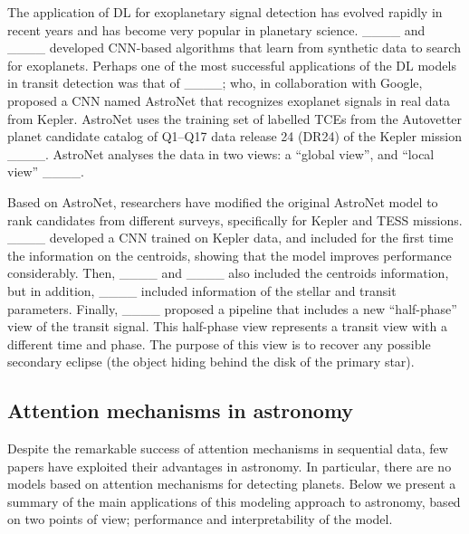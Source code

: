 The application of DL for exoplanetary signal detection has evolved rapidly in recent years and has become very popular in planetary science.  ____ and ____ developed CNN-based algorithms that learn from synthetic data to search for exoplanets. Perhaps one of the most successful applications of the DL models in transit detection was that of ____; who, in collaboration with Google, proposed a CNN named AstroNet that recognizes exoplanet signals in real data from Kepler. AstroNet uses the training set of labelled TCEs from the Autovetter planet candidate catalog of Q1–Q17 data release 24 (DR24) of the Kepler mission ____. AstroNet analyses the data in two views: a ``global view'', and ``local view'' ____. \par




Based on AstroNet, researchers have modified the original AstroNet model to rank candidates from different surveys, specifically for Kepler and TESS missions. ____ developed a CNN trained on Kepler data, and included for the first time the information on the centroids, showing that the model improves performance considerably. Then, ____ and ____ also included the centroids information, but in addition, ____ included information of the stellar and transit parameters. Finally, ____ proposed a pipeline that includes a new ``half-phase'' view of the transit signal. This half-phase view represents a transit view with a different time and phase. The purpose of this view is to recover any possible secondary eclipse (the object hiding behind the disk of the primary star).


%



\subsection{Attention mechanisms in astronomy}
\label{sec:relatedwork_attention}
Despite the remarkable success of attention mechanisms in sequential data, few papers have exploited their advantages in astronomy. In particular, there are no models based on attention mechanisms for detecting planets. Below we present a summary of the main applications of this modeling approach to astronomy, based on two points of view; performance and interpretability of the model.\par

